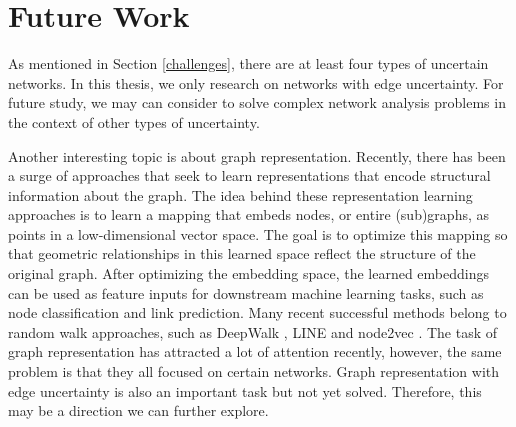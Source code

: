 \documentclass[\main/thesis.tex]{subfiles}
\begin{document}

\newpage

\section{Future Work}
As mentioned in Section \ref{challenges}, there are at least four types of uncertain networks. In this thesis, we only research on networks with edge uncertainty. For future study, we may can consider to solve complex network analysis problems in the context of other types of uncertainty.

Another interesting topic is about graph representation. Recently, there has been a surge of approaches that seek to learn representations that encode structural information about the graph. The idea behind these representation learning approaches is to learn a mapping that embeds nodes, or entire (sub)graphs, as points in a low-dimensional vector space. The goal is to optimize this mapping so that geometric relationships in this learned space reflect the structure of the original graph. After optimizing the embedding space, the learned embeddings can be used as feature inputs for downstream machine learning tasks, such as node classification and link prediction. Many recent successful methods belong to random walk approaches, such as DeepWalk \cite{perozzi2014deepwalk}, LINE \cite{tang2015line} and node2vec \cite{grover2016node2vec}. The task of graph representation has attracted a lot of attention recently, however, the same problem is that they all focused on certain networks. Graph representation with edge uncertainty is also an important task but not yet solved. Therefore, this may be a direction we can further explore.

\end{document}
